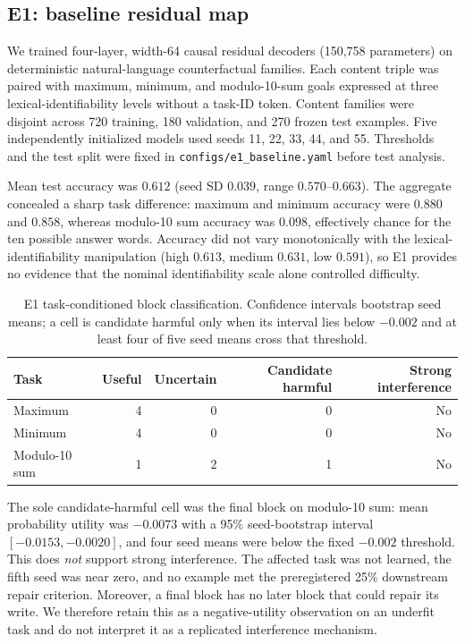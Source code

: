 \documentclass[10pt]{article}
\begin{document}
\subsection{E1: baseline residual map}
We trained four-layer, width-64 causal residual decoders (150,758 parameters) on deterministic natural-language counterfactual families. Each content triple was paired with maximum, minimum, and modulo-10-sum goals expressed at three lexical-identifiability levels without a task-ID token. Content families were disjoint across 720 training, 180 validation, and 270 frozen test examples. Five independently initialized models used seeds 11, 22, 33, 44, and 55. Thresholds and the test split were fixed in \texttt{configs/e1\_baseline.yaml} before test analysis.

Mean test accuracy was $0.612$ (seed SD $0.039$, range $0.570$--$0.663$). The aggregate concealed a sharp task difference: maximum and minimum accuracy were $0.880$ and $0.858$, whereas modulo-10 sum accuracy was $0.098$, effectively chance for the ten possible answer words. Accuracy did not vary monotonically with the lexical-identifiability manipulation (high $0.613$, medium $0.631$, low $0.591$), so E1 provides no evidence that the nominal identifiability scale alone controlled difficulty.

\begin{table}[ht]
\centering
\caption{E1 task-conditioned block classification. Confidence intervals bootstrap seed means; a cell is candidate harmful only when its interval lies below $-0.002$ and at least four of five seed means cross that threshold.}
\begin{tabular}{lrrrr}
\toprule
Task & Useful & Uncertain & Candidate harmful & Strong interference \\
\midrule
Maximum & 4 & 0 & 0 & No \\
Minimum & 4 & 0 & 0 & No \\
Modulo-10 sum & 1 & 2 & 1 & No \\
\bottomrule
\end{tabular}
\end{table}

The sole candidate-harmful cell was the final block on modulo-10 sum: mean probability utility was $-0.0073$ with a 95\% seed-bootstrap interval $[-0.0153,-0.0020]$, and four seed means were below the fixed $-0.002$ threshold. This does \emph{not} support strong interference. The affected task was not learned, the fifth seed was near zero, and no example met the preregistered 25\% downstream repair criterion. Moreover, a final block has no later block that could repair its write. We therefore retain this as a negative-utility observation on an underfit task and do not interpret it as a replicated interference mechanism.
\end{document}
